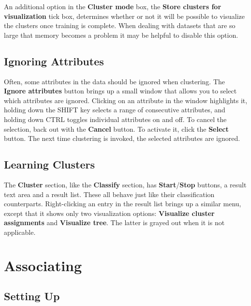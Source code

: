 \documentclass[a4paper]{article}
\begin{document}
An additional option in the \textbf{Cluster mode} box, the \textbf{Store
clusters for visualization} tick box, determines whether or not it will be
possible to visualize the clusters once training is complete. When dealing
with datasets that are so large that memory becomes a problem it may be
helpful to disable this option.

\subsection{Ignoring Attributes}

Often, some attributes in the data should be ignored when clustering.  The
\textbf{Ignore attributes} button brings up a small window that allows you to
select which attributes are ignored.  Clicking on an attribute in the window
highlights it, holding down the SHIFT key selects a range of consecutive
attributes, and holding down CTRL toggles individual attributes on and off. To
cancel the selection, back out with the \textbf{Cancel} button. To activate it,
click the \textbf{Select} button. The next time clustering is invoked, the
selected attributes are ignored.

\subsection{Learning Clusters}

The \textbf{Cluster} section, like the \textbf{Classify} section, has
\textbf{Start}/\textbf{Stop} buttons, a result text area and a result
list. These all behave just like their classification counterparts.
Right-clicking an entry in the result list brings up a similar menu,
except that it shows only two visualization options: \textbf{Visualize
cluster assignments} and \textbf{Visualize tree}. The latter is grayed
out when it is not applicable.

\newpage

\section{Associating}

\begin{center}
\end{center}

\subsection{Setting Up}
\end{document}
